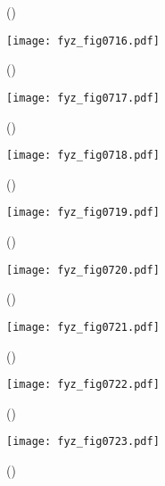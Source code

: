     \begin{figure}[ht!]
      \centering
      \label{fyz:fig0715}
      \caption{
               (\cite[s.~748]{Feynman02})}
    \end{figure}

    \begin{figure}[ht!] %
      \centering
      \texttt{[image: fyz\_fig0716.pdf]}
      \caption{
               (\cite[s.~707]{Feynman02})}
      \label{fyz:fig0716}
    \end{figure}

    \begin{figure}[ht!] %
      \centering
      \texttt{[image: fyz\_fig0717.pdf]}
      \caption{
               (\cite[s.~707]{Feynman02})}
      \label{fyz:fig0717}
    \end{figure}

    \begin{figure}[ht!] %
      \centering
      \texttt{[image: fyz\_fig0718.pdf]}
      \caption{
               (\cite[s.~707]{Feynman02})}
      \label{fyz:fig0718}
    \end{figure}

    \begin{figure}[ht!] %
      \centering
      \texttt{[image: fyz\_fig0719.pdf]}
      \caption{
               (\cite[s.~707]{Feynman02})}
      \label{fyz:fig0719}
    \end{figure}

    \begin{figure}[ht!] %
      \centering
      \texttt{[image: fyz\_fig0720.pdf]}
      \caption{
               (\cite[s.~707]{Feynman02})}
      \label{fyz:fig0720}
    \end{figure}

    \begin{figure}[ht!] %
      \centering
      \texttt{[image: fyz\_fig0721.pdf]}
      \caption{
               (\cite[s.~707]{Feynman02})}
      \label{fyz:fig0721}
    \end{figure}

    \begin{figure}[ht!] %
      \centering
      \texttt{[image: fyz\_fig0722.pdf]}
      \caption{
               (\cite[s.~707]{Feynman02})}
      \label{fyz:fig0722}
    \end{figure}

    \begin{figure}[ht!] %
      \centering
      \texttt{[image: fyz\_fig0723.pdf]}
      \caption{
               (\cite[s.~707]{Feynman02})}
      \label{fyz:fig0723}
    \end{figure}

